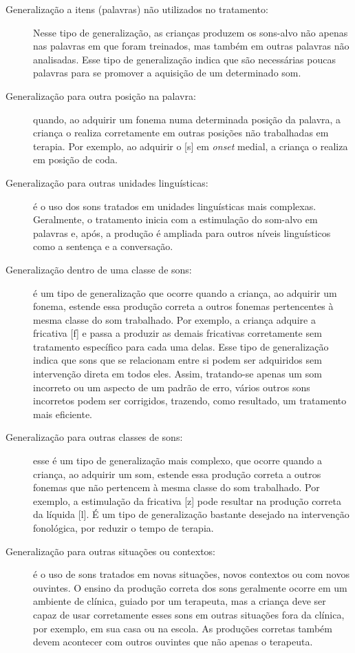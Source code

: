 \documentclass[output=paper,colorlinks,citecolor=brown,booklanguage=portuguese]{langscibook}
\begin{document}
\sloppy
\begin{description}
\item[Generalização a itens (palavras) não utilizados no tratamento:] Nesse tipo de generalização, as crianças produzem os sons-alvo não apenas nas palavras em que foram treinados, mas também em outras palavras não analisadas. Esse tipo de generalização indica que são necessárias poucas palavras para se promover a aquisição de um determinado som.

\item[Generalização para outra posição na palavra:] quando, ao adquirir um fonema numa determinada posição da palavra, a criança o realiza corretamente em outras posições não trabalhadas em terapia. Por exemplo, ao adquirir o [s] em \emph{onset} medial, a criança o realiza em posição de coda.

\item[Generalização para outras unidades linguísticas:] é o uso dos sons tratados em unidades linguísticas mais complexas. Geralmente, o tratamento inicia com a estimulação do som-alvo em palavras e, após, a produção é ampliada para outros níveis linguísticos como a sentença e a conversação.

\item[Generalização dentro de uma classe de sons:] é um tipo de generalização que ocorre quando a criança, ao adquirir um fonema, estende essa produção correta a outros fonemas pertencentes à mesma classe do som trabalhado. Por exemplo, a criança adquire a fricativa [f] e passa a produzir as demais fricativas corretamente sem tratamento específico para cada uma delas. Esse tipo de generalização indica que sons que se relacionam entre si podem ser adquiridos sem intervenção direta em todos eles. Assim, tratando-se apenas um som incorreto ou um aspecto de um padrão de erro, vários outros sons incorretos podem ser corrigidos, trazendo, como resultado, um tratamento mais eficiente.

\item[Generalização para outras classes de sons:] esse é um tipo de generalização mais complexo, que ocorre quando a criança, ao adquirir um som, estende essa produção correta a outros fonemas que não pertencem à mesma classe do som trabalhado. Por exemplo, a estimulação da fricativa [z] pode resultar na produção correta da líquida [l]. É um tipo de generalização bastante desejado na intervenção fonológica, por reduzir o tempo de terapia.

\item[Generalização para outras situações ou contextos:] é o uso de sons tratados em novas situações, novos contextos ou com novos ouvintes. O ensino da produção correta dos sons geralmente ocorre em um ambiente de clínica, guiado por um terapeuta, mas a criança deve ser capaz de usar corretamente esses sons em outras situações fora da clínica, por exemplo, em sua casa ou na escola. As produções corretas também devem acontecer com outros ouvintes que não apenas o terapeuta.


\end{description}
\end{document}
